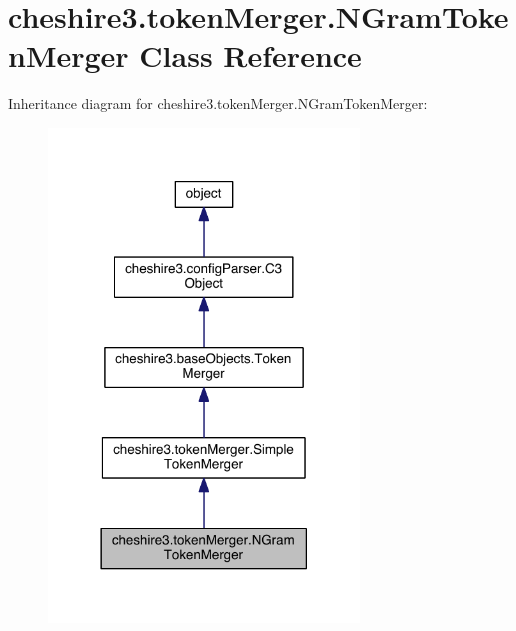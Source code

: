 \hypertarget{classcheshire3_1_1token_merger_1_1_n_gram_token_merger}{\section{cheshire3.\-token\-Merger.\-N\-Gram\-Token\-Merger Class Reference}
\label{classcheshire3_1_1token_merger_1_1_n_gram_token_merger}
}


Inheritance diagram for cheshire3.\-token\-Merger.\-N\-Gram\-Token\-Merger\-:
\nopagebreak
\begin{figure}[H]
\begin{center}
\leavevmode
\includegraphics[width=234pt]{classcheshire3_1_1token_merger_1_1_n_gram_token_merger__inherit__graph}
\end{center}
\end{figure}


